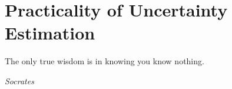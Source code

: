 \chapter{Practicality of Uncertainty Estimation}
\label{chap:practicality}

\epigraph{The only true wisdom is in knowing you know nothing.}{\textit{Socrates}}

% 
% 
% 
% 
% 
% 


